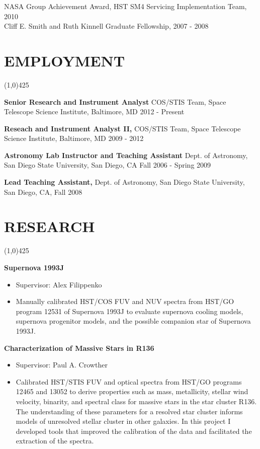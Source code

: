 \documentclass{res}
\begin{document}
\begin{resume}
NASA Group Achievement Award, HST SM4 Servicing Implementation Team, 2010 \\
Cliff E. Smith and Ruth Kinnell Graduate Fellowship, 2007 - 2008 \\
 
\section{EMPLOYMENT}
\vspace{-.2in} 
\begin{center}
\line(1,0){425}
\end{center}
\vspace{-.3in} 
\vspace{0.1in} 
    {\bf Senior Research and Instrument Analyst} COS/STIS Team, Space Telescope Science Institute, Baltimore, MD
    2012 - Present

    {\bf Reseach and Instrument Analyst II,} COS/STIS Team, Space Telescope Science Institute, Baltimore, MD 
    2009 - 2012 
 
    {\bf Astronomy Lab Instructor and Teaching Assistant} Dept. of Astronomy, San Diego State University, San Diego, CA  Fall 2006 - Spring 2009 
 
    {\bf Lead Teaching Assistant,} Dept. of Astronomy, San Diego State University, San Diego, CA, Fall 2008
    

\section{RESEARCH} 
\vspace{-.2in}
\begin{center}
\line(1,0){425}
\end{center}
\vspace{-.3in}
\vspace{0.1in}
   {\bf  Supernova 1993J}
          \begin{itemize}
   	\item[] Supervisor: Alex Filippenko

        \item[] Manually calibrated HST/COS FUV and NUV spectra from HST/GO program 12531 of Supernova 1993J to evaluate supernova cooling models, 
        supernova progenitor models, and the possible companion star of Supernova 1993J. 
        \end{itemize} 
 
   {\bf  Characterization of Massive Stars in R136 } 
        \begin{itemize}
        \item[] Supervisor: Paul A. Crowther
        \item[] Calibrated HST/STIS FUV and optical spectra from HST/GO programs 12465 and 13052 to derive properties such as mass, metallicity, stellar wind velocity, binarity, and spectral class for massive stars in the star cluster R136. The understanding of these parameters for a resolved star cluster informs models of unresolved stellar cluster in other galaxies. In this project I developed tools that improved the calibration of the data and facilitated the extraction of the spectra.
        \end{itemize} 
        

\end{resume}
\end{document}
